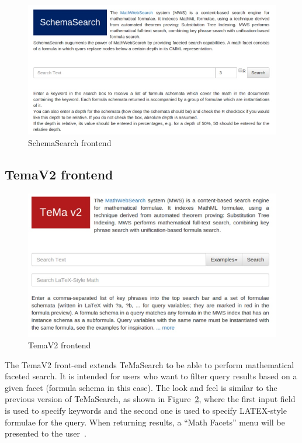 \documentclass{deliverablereport}
\begin{document}
\begin{figure}[h]
\centering
 \includegraphics[scale=0.9]{figure5.jpg}
 \caption{SchemaSearch frontend}
 \label{fig:schema_search}
\end{figure}



\subsection{TemaV2 frontend}\label{v2}

\begin{figure}[H]
\centering
 \includegraphics[scale=0.8]{figure8.jpg}
 \caption{TemaV2 frontend}
 \label{fig:temav2}
\end{figure}

The TemaV2 front-end extends TeMaSearch to be able to perform mathematical faceted
search. It is intended for users who want to filter query results based on a given facet
(formula schema in this case). The look and feel is similar to the previous version of
TeMaSearch, as shown in Figure~\ref{fig:temav2}, where the first input field is used to
specify keywords and the second one is used to specify LATEX-style formulae for the
query. When returning results, a “Math Facets” menu will be presented to the
user~\cite{Ham:bcs15}.
\end{document}
